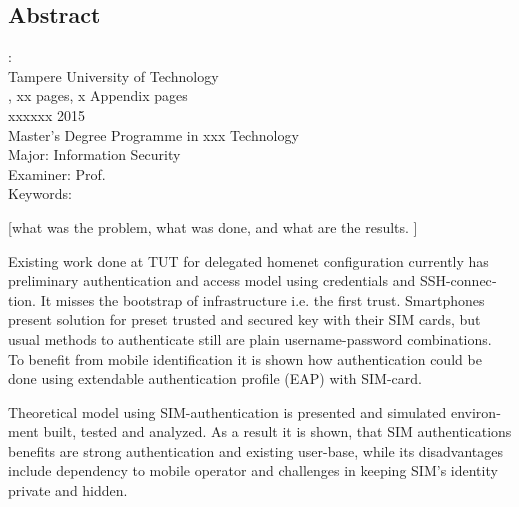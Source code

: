 \documentclass[12pt,a4paper,english]{tutthesis}
\begin{document}
\if@twoside
\clearpage
\fi


\setcounter{page}{0} %

\begin{otherlanguage}{english} %
\chapter*{Abstract}

\begin{spacing}{1.0}
  {\bf \textsf{\MakeUppercase{\@author}}}: \@title\\   %
   \textsf{Tampere University of Technology}\\
   \textsf{\@thesistype, xx pages, x Appendix pages} \\
   \textsf{xxxxxx 2015}\\
   \textsf{Master's Degree Programme in xxx Technology}\\
   \textsf{Major: Information Security}\\
   \textsf{Examiner: Prof. \@examiner}\\ %
   \textsf{Keywords: }\\
\end{spacing}

[what was the problem, what was done, and what are the results. ]

Existing work done at TUT for delegated homenet configuration
currently has preliminary authentication and access model using
credentials and SSH-connection. It misses the bootstrap of 
infrastructure i.e. the first trust. 
Smartphones present solution for preset trusted and secured 
key with their SIM cards, but 
usual methods to authenticate still are plain username-password combinations.  
To benefit from mobile identification it is shown how authentication could be done
using extendable authentication profile (EAP) with SIM-card. 


Theoretical model using SIM-authentication is presented and simulated environment
built, tested and analyzed.
As a result it is shown, that SIM authentications benefits are strong
authentication and existing user-base, while its disadvantages include
dependency to mobile operator and challenges in keeping SIM's identity private and hidden.


\end{otherlanguage}
\end{document}
